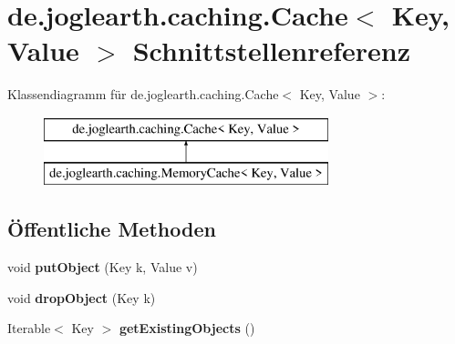 \section{de.\-joglearth.\-caching.\-Cache$<$ \-Key, \-Value $>$ \-Schnittstellenreferenz}
\label{interfacede_1_1joglearth_1_1caching_1_1_cache_3_01_key_00_01_value_01_4}
\-Klassendiagramm für de.\-joglearth.\-caching.\-Cache$<$ \-Key, \-Value $>$\-:\begin{figure}[H]
\begin{center}
\leavevmode
\includegraphics[height=2.000000cm]{interfacede_1_1joglearth_1_1caching_1_1_cache_3_01_key_00_01_value_01_4}
\end{center}
\end{figure}
\subsection*{Öffentliche \-Methoden}
\begin{DoxyCompactItemize}
\item 
void {\bfseries put\-Object} (\-Key k, \-Value v)\label{interfacede_1_1joglearth_1_1caching_1_1_cache_3_01_key_00_01_value_01_4_a0980f19f862ff7e17ed95a504b2b9607}

\item 
void {\bfseries drop\-Object} (\-Key k)\label{interfacede_1_1joglearth_1_1caching_1_1_cache_3_01_key_00_01_value_01_4_ac30e620b3eed27411662b0ac177b8eb0}

\item 
\-Iterable$<$ \-Key $>$ {\bfseries get\-Existing\-Objects} ()\label{interfacede_1_1joglearth_1_1caching_1_1_cache_3_01_key_00_01_value_01_4_a5dd1ba2f704872ea375db56953eba61d}

\end{DoxyCompactItemize}
